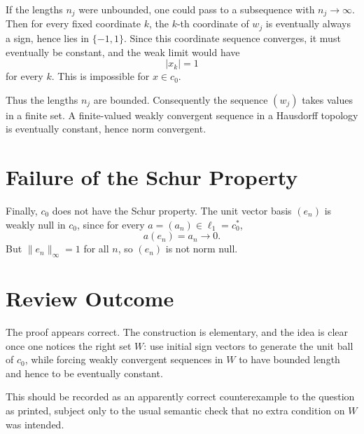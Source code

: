 \documentclass[11pt]{article}
\begin{document}
If the lengths \(n_j\) were unbounded, one could pass to a subsequence with
\(n_j\to\infty\).  Then for every fixed coordinate \(k\), the \(k\)-th
coordinate of \(w_j\) is eventually always a sign, hence lies in
\(\{-1,1\}\).  Since this coordinate sequence converges, it must eventually be
constant, and the weak limit would have
\[
  |x_k|=1
\]
for every \(k\).  This is impossible for \(x\in c_0\).

Thus the lengths \(n_j\) are bounded.  Consequently the sequence \((w_j)\)
takes values in a finite set.  A finite-valued weakly convergent sequence in a
Hausdorff topology is eventually constant, hence norm convergent.

\section*{Failure of the Schur Property}

Finally, \(c_0\) does not have the Schur property.  The unit vector basis
\((e_n)\) is weakly null in \(c_0\), since for every
\(a=(a_n)\in\ell_1=c_0^*\),
\[
  a(e_n)=a_n\to0.
\]
But \(\|e_n\|_\infty=1\) for all \(n\), so \((e_n)\) is not norm null.

\section*{Review Outcome}

The proof appears correct.  The construction is elementary, and the idea is
clear once one notices the right set \(W\): use initial sign vectors to
generate the unit ball of \(c_0\), while forcing weakly convergent sequences in
\(W\) to have bounded length and hence to be eventually constant.

This should be recorded as an apparently correct counterexample to the
question as printed, subject only to the usual semantic check that no extra
condition on \(W\) was intended.
\end{document}
